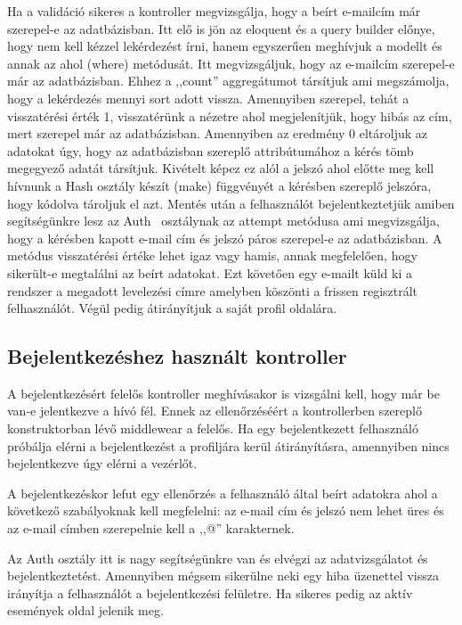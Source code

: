 \documentclass[
]{thesis-ekf}
\theoremstyle{definition}
\theoremstyle{remark}
\begin{document}
Ha a validáció sikeres a kontroller megvizsgálja, hogy a beírt e-mailcím már szerepel-e az adatbázisban. Itt elő is jön az eloquent és a query builder előnye, hogy nem kell kézzel lekérdezést írni, hanem egyszerűen meghívjuk a modellt és annak az ahol (where) metódusát. Itt megvizsgáljuk, hogy az e-mailcím szerepel-e már az adatbázisban. Ehhez a ,,count'' aggregátumot társítjuk ami megszámolja, hogy a lekérdezés mennyi sort adott vissza. Amennyiben szerepel, tehát a visszatérési érték 1, visszatérünk a nézetre ahol megjelenítjük, hogy hibás az cím, mert szerepel már az adatbázisban. Amennyiben az eredmény 0 eltároljuk az adatokat úgy, hogy az adatbázisban szereplő attribútumához a kérés tömb megegyező adatát társítjuk. Kivételt képez ez alól a jelszó ahol előtte meg kell hívnunk a Hash osztály készít (make) függvényét a kérésben szereplő jelszóra, hogy kódolva tároljuk el azt. Mentés után a felhasználót bejelentkeztetjük amiben segítségünkre lesz az Auth~\cite{laravel_auth} osztálynak az attempt metódusa ami megvizsgálja, hogy a kérésben kapott e-mail cím és jelszó páros szerepel-e az adatbázisban. A metódus visszatérési értéke lehet igaz vagy hamis, annak megfelelően, hogy sikerült-e megtalálni az beírt adatokat. Ezt követően egy e-mailt küld ki a rendszer a megadott levelezési címre amelyben köszönti a frissen regisztrált felhasználót. Végül pedig átirányítjuk a saját profil oldalára.

\subsection{Bejelentkezéshez használt kontroller}
A bejelentkezésért felelős kontroller meghívásakor is vizsgálni kell, hogy már be van-e jelentkezve a hívó fél. Ennek az ellenőrzéséért a kontrollerben szereplő konstruktorban lévő middlewear a felelős. Ha egy bejelentkezett felhasználó próbálja elérni a bejelentkezést a profiljára kerül átirányításra, amennyiben nincs bejelentkezve úgy elérni a vezérlőt.

A bejelentkezéskor lefut egy ellenőrzés a felhasználó által beírt adatokra ahol a következő szabályoknak kell megfelelni: az e-mail cím és jelszó nem lehet üres és az e-mail címben szerepelnie kell a ,,@'' karakternek.

Az Auth osztály itt is nagy segítségünkre van és elvégzi az adatvizsgálatot és bejelentkeztetést. Amennyiben mégsem sikerülne neki egy hiba üzenettel vissza irányítja a felhasználót a bejelentkezési felületre. Ha sikeres pedig az aktív események oldal jelenik meg.
\end{document}
